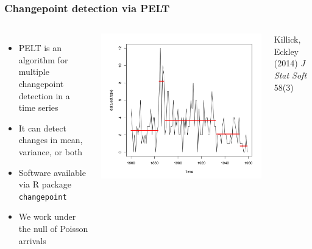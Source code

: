 \documentclass[table,aspectratio=169]{beamer}
\begin{document}
\begin{frame}[t]\frametitle{Changepoint detection via PELT}
    \begin{columns}
        \begin{itemize}
            \item PELT is an algorithm for multiple changepoint detection in a time series
            \item It can detect changes in mean, variance, or both
            \item Software available via R package \texttt{changepoint}
            \item We work under the null of Poisson arrivals
        \end{itemize}

        \centering
        \includegraphics[width=.85\textwidth]{pelt}

        {\tiny Killick, Eckley (2014) \emph{J Stat Soft} 58(3)}
    \end{columns}
\end{frame}
\end{document}
